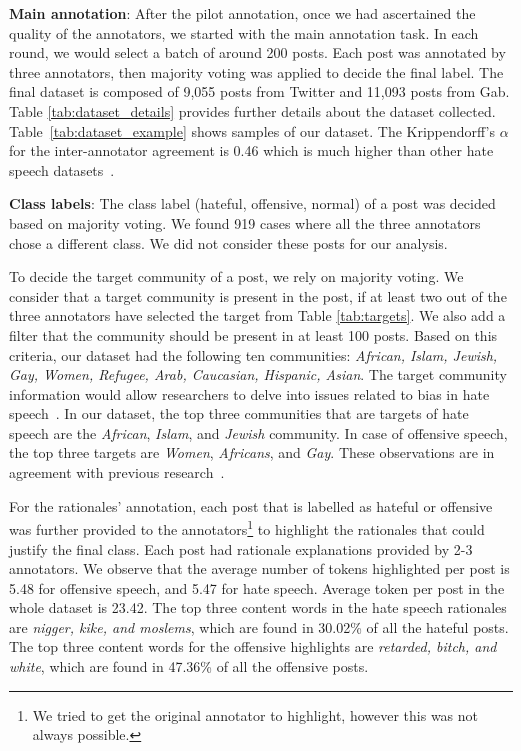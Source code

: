 \documentclass[letterpaper]{article} \usepackage{aaai21}  \usepackage{times}  \usepackage{helvet} \usepackage{courier}  \usepackage[hyphens]{url}  \usepackage{graphicx} \urlstyle{rm} \def\UrlFont{\rm}  \usepackage{natbib}  \usepackage{caption}
\begin{document}
\noindent\textbf{Main annotation}: After the pilot annotation, once we had ascertained the quality of the annotators, we started with the main annotation task. In each round, we would select a batch of around 200 posts. Each post was annotated by three annotators, then majority voting was applied to decide the final label. The final dataset is composed of 9,055 posts from Twitter and 11,093 posts from Gab. Table \ref{tab:dataset_details} provides further details about the dataset collected. Table~\ref{tab:dataset_example} shows samples of our dataset. The Krippendorff's $\alpha$ for the inter-annotator agreement is 0.46 which is much higher than other hate speech datasets~\cite{del2017hate,ousidhoum2019multilingual}.



\noindent\textbf{Class labels}: The class label (hateful, offensive, normal) of a post was decided based on majority voting. We found 919 cases where all the three annotators chose a different class. We did not consider these posts for our analysis. 

To decide the target community of a post, we rely on majority voting. We consider that a target community is present in the post, if at least two out of the three annotators have selected the target from Table \ref{tab:targets}. We also add a filter that the community should be present in at least 100 posts. Based on this criteria, our dataset had the following ten communities: \textit{African, Islam, Jewish, Gay, Women, Refugee, Arab, Caucasian, Hispanic, Asian}. The target community information would allow researchers to delve into issues related to bias in hate speech~\cite{davidson2019racial}. In our dataset, the top three communities that are targets of hate speech are the \textit{African}, \textit{Islam}, and \textit{Jewish} community. In case of offensive speech, the top three targets are \textit{Women}, \textit{Africans}, and \textit{Gay}. These observations are in agreement with previous research~\cite{silva2016analyzing}.

For the rationales' annotation, each post that is labelled as hateful or offensive was further provided to the annotators\footnote{We tried to get the original annotator to highlight, however this was not always possible.} to highlight the rationales that could justify the final class. Each post had rationale explanations provided by 2-3 annotators. We observe that the average number of tokens highlighted per post is 5.48 for offensive speech, and 5.47 for hate speech. Average token per post in the whole dataset is 23.42. The top three content words in the hate speech rationales are \textit{nigger, kike, and moslems}, which are found in 30.02\% of all the hateful posts. The top three content words for the offensive highlights are \textit{retarded, bitch, and white}, which are found in 47.36\% of all the offensive posts. 
\end{document}
